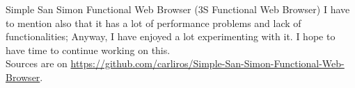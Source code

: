 \documentclass{scrreprt}
\begin{document}
\begin{hcarentry}{Simple San Simon Functional Web Browser (3S Functional Web Browser)}
I have to mention also that it has a lot of performance problems and lack of functionalities; Anyway, I have enjoyed a lot experimenting with it. 
I hope to have time to continue working on this.\\

Sources are on \url{https://github.com/carliros/Simple-San-Simon-Functional-Web-Browser}.

\end{hcarentry}
\end{document}
